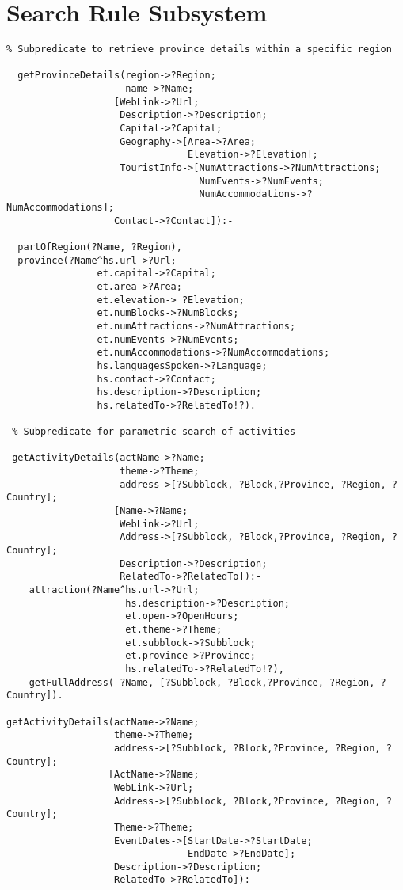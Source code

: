 \section*{Search Rule Subsystem}
\singlespacing
\footnotesize
\begin{verbatim}
% Subpredicate to retrieve province details within a specific region

  getProvinceDetails(region->?Region; 
                     name->?Name;
                   [WebLink->?Url;
                    Description->?Description;
                    Capital->?Capital;
                    Geography->[Area->?Area;
                                Elevation->?Elevation];
                    TouristInfo->[NumAttractions->?NumAttractions;
                                  NumEvents->?NumEvents;
                                  NumAccommodations->?NumAccommodations];
                   Contact->?Contact]):-
			  
  partOfRegion(?Name, ?Region),
  province(?Name^hs.url->?Url;
                et.capital->?Capital;
                et.area->?Area;
                et.elevation-> ?Elevation;
                et.numBlocks->?NumBlocks;
                et.numAttractions->?NumAttractions;
                et.numEvents->?NumEvents;
                et.numAccommodations->?NumAccommodations;
                hs.languagesSpoken->?Language;
                hs.contact->?Contact;
                hs.description->?Description;
                hs.relatedTo->?RelatedTo!?).
                
 % Subpredicate for parametric search of activities 
 
 getActivityDetails(actName->?Name;
                    theme->?Theme; 
                    address->[?Subblock, ?Block,?Province, ?Region, ?Country];
                   [Name->?Name; 
                    WebLink->?Url; 
                    Address->[?Subblock, ?Block,?Province, ?Region, ?Country];
                    Description->?Description;    
                    RelatedTo->?RelatedTo]):-
    attraction(?Name^hs.url->?Url; 
                     hs.description->?Description; 
                     et.open->?OpenHours;
                     et.theme->?Theme; 
                     et.subblock->?Subblock; 
                     et.province->?Province;  
                     hs.relatedTo->?RelatedTo!?),
    getFullAddress( ?Name, [?Subblock, ?Block,?Province, ?Region, ?Country]).
 
getActivityDetails(actName->?Name;
                   theme->?Theme; 
                   address->[?Subblock, ?Block,?Province, ?Region, ?Country];
                  [ActName->?Name;
                   WebLink->?Url; 
                   Address->[?Subblock, ?Block,?Province, ?Region, ?Country];
                   Theme->?Theme;
                   EventDates->[StartDate->?StartDate; 
                                EndDate->?EndDate];
                   Description->?Description;    
                   RelatedTo->?RelatedTo]):-


\end{verbatim}
